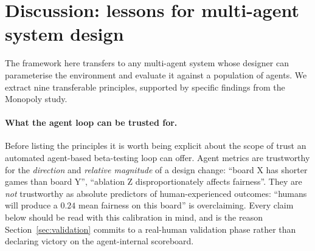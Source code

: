 \documentclass[10pt]{article}
\begin{document}
\section{Discussion: lessons for multi-agent system design}\label{sec:gen}

The framework here transfers to any multi-agent system whose designer can
parameterise the environment and evaluate it against a population of
agents. We extract nine transferable principles, supported by specific
findings from the Monopoly study.

\paragraph{What the agent loop can be trusted for.} Before listing the
principles it is worth being explicit about the scope of trust an
automated agent-based beta-testing loop can offer. Agent metrics are
trustworthy for the \emph{direction} and \emph{relative magnitude} of a
design change: ``board X has shorter games than board Y'', ``ablation Z
disproportionately affects fairness''. They are \emph{not} trustworthy as
absolute predictors of human-experienced outcomes: ``humans will
produce a $0.24$ mean fairness on this board'' is overclaiming. Every
claim below should be read with this calibration in mind, and is the
reason Section~\ref{sec:validation} commits to a real-human validation
phase rather than declaring victory on the agent-internal scoreboard.
\end{document}
